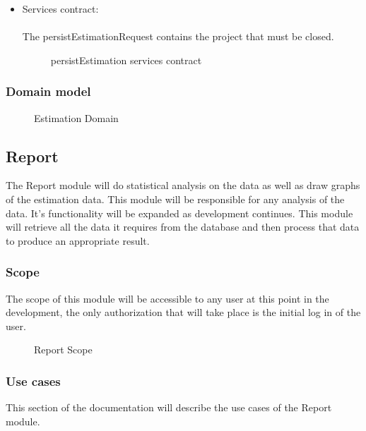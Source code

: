 	\begin{itemize}
		\item Services contract:\\ \\
		The persistEstimationRequest contains the project that must be closed.
		\begin{figure}[H]
	    	\centering
	    	\caption{persistEstimation services contract}
	    	\label{fig:persistEstimationServicesContract}
	   	\end{figure}

	\end{itemize}


\subsubsection{Domain model}
	\begin{figure}[H]
	    	\centering
	    	\caption{Estimation Domain}
	    	\label{fig:Estimation_Domain.png}
   	\end{figure}
\subsection{Report}
The Report module will do statistical analysis on the data as well as draw graphs of the estimation data. This module will be responsible for any analysis of the data. It's functionality will be expanded as development continues. This module will retrieve all the data it requires from the database and then process that data to produce an appropriate result.
\subsubsection{Scope}
The scope of this module will be accessible to any user at this point in the development, the only authorization that will take place is the initial log in of the user.
	\begin{figure}[H]
	    	\centering
	    	\caption{Report Scope}
	    	\label{fig:Report_Scope.png}
   	\end{figure}
\subsubsection{Use cases}
	This section of the documentation will describe the use cases of the Report module.
